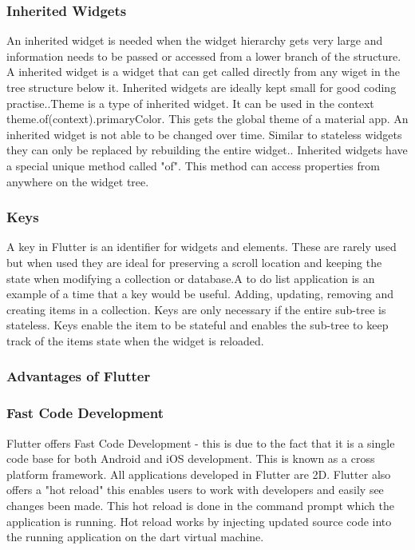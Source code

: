 \subsubsection{Inherited Widgets}
An inherited widget is needed when the widget hierarchy gets very large and  information needs to be passed or accessed from a lower branch of the structure. A inherited widget is a widget that can get called directly from any wiget in the tree structure below it. Inherited widgets are ideally kept small for good coding practise.\cite{fidanboylu_2019}.Theme is a type of inherited widget. It can be used in the context theme.of(context).primaryColor. This gets the global theme of a material app. An inherited widget is not able to be changed over time. Similar to stateless widgets they can only be replaced by rebuilding the entire widget.\cite{inherited_widgets}. Inherited widgets have a special unique method called "of". This method can access properties from anywhere on the widget tree.\cite{inheritedwidget_2018}

\subsubsection{Keys}
A key in Flutter is an identifier for widgets and elements. These are rarely used but when used they are ideal for preserving a scroll location and keeping the state when modifying a collection or database.\cite{key_widgets}A to do list application is an example of a time that a key would be useful. Adding, updating, removing and creating items in a collection. Keys are only necessary if the entire sub-tree is stateless. Keys enable the item to be stateful and enables the sub-tree to keep track of the items state when the widget is reloaded. \cite{keys}

\subsubsection{Advantages of Flutter}

\subsubsection{Fast Code Development}
Flutter offers Fast Code Development - this is due to the fact that it is a single code base for both Android and iOS development. This is known as a cross platform framework. All applications developed in Flutter are 2D. Flutter also offers a "hot reload" this enables users to work with developers and easily see changes been made. This hot reload is done in the command prompt which the application is running. Hot reload works by injecting updated source code into the running application on the dart virtual machine.\cite{faq_2019}
